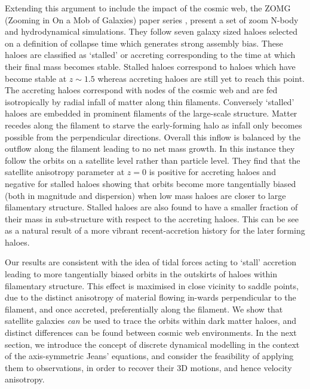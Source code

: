 Extending this argument to include the impact of the cosmic web, the ZOMG (Zooming in On a Mob of Galaxies) paper series \cite{ZOMGI,ZOMGII,garaldi2018}, present a set of zoom N-body and hydrodynamical simulations. They follow seven galaxy sized haloes selected on a definition of collapse time which generates strong assembly bias. These haloes are classified as `stalled' or accreting corresponding to the time at which their final mass becomes stable. Stalled haloes correspond to haloes which have become stable at $z \sim 1.5$ whereas accreting haloes are still yet to reach this point. 
The accreting haloes correspond with nodes of the cosmic web and are fed isotropically by radial infall of matter along thin filaments. Conversely `stalled' haloes are embedded in prominent filaments of the large-scale structure. Matter recedes along the filament to starve the early-forming halo as infall only becomes possible from the perpendicular directions. Overall this inflow is balanced by the outflow along the filament leading to no net mass growth. In this instance they follow the orbits on a satellite level rather than particle level. They find that the satellite anisotropy parameter at $z = 0$ is positive for accreting haloes and negative for stalled haloes showing that orbits become more tangentially biased (both in magnitude and dispersion) when low mass haloes are closer to large filamentary structure. Stalled haloes are also found to have a smaller fraction of their mass in sub-structure with respect to the accreting haloes. This can be see as a natural result of a more vibrant recent-accretion history for the later forming haloes. 

Our results are consistent with the idea of tidal forces acting to `stall' accretion leading to more tangentially biased orbits in the outskirts of haloes within filamentary structure. This effect is maximised in close vicinity to saddle points, due to the distinct anisotropy of material flowing in-wards perpendicular to the filament, and once accreted, preferentially along the filament. We show that satellite galaxies \textit{can} be used to trace the orbits within dark matter haloes, and distinct differences can be found between cosmic web environments. In the next section, we introduce the concept of discrete dynamical modelling in the context of the axis-symmetric Jeans' equations, and consider the feasibility of applying them to observations, in order to recover their 3D motions, and hence velocity anisotropy.

